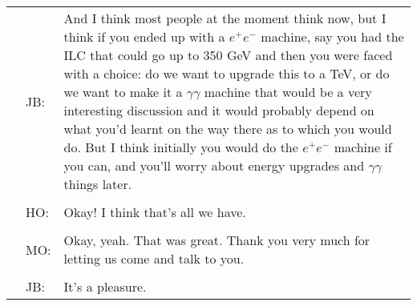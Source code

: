 \clearpage

\begin{table}[!ht]
\begin{tabular}{@{}p{0mm}p{5mm}p{120mm}@{}}
& JB: & And I think most people at the moment think now, but I think if you ended up with a $e^{+}e^{-}$ machine, say you had the ILC that could go up to 350 GeV and then you were faced with a choice: do we want to upgrade this to a TeV, or do we want to make it a $\gamma\gamma$ machine that would be a very interesting discussion and it would probably depend on what you'd learnt on the way there as to which you would do. But I think initially you would do the $e^{+}e^{-}$ machine if you can, and you'll worry about energy upgrades and $\gamma\gamma$ things later.\\\\

& HO: & Okay! I think that's all we have.\\\\

& MO: & Okay, yeah. That was great. Thank you very much for letting us come and talk to you.\\\\

& JB: & It's a pleasure.
\end{tabular}
\end{table}
